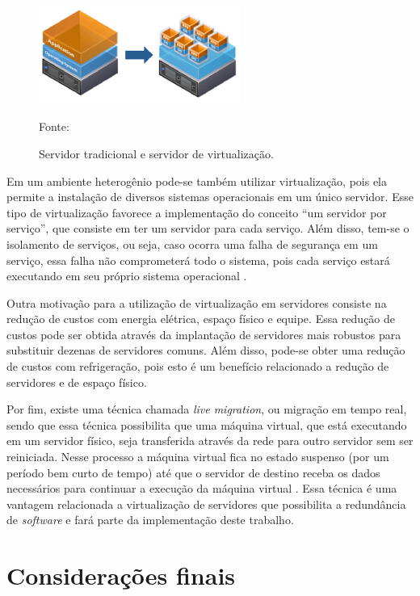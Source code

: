\begin{figure}[h!]
 \centering
 \includegraphics[width=250px]{img/virtualizacao_servidores.eps}
 \caption{Servidor tradicional e servidor de virtualização.}
 \label{fig:virtualizacao_servidores}
 Fonte: \citet{interspire2016}
\end{figure}

Em um ambiente heterogênio pode-se também utilizar virtualização, pois ela permite a instalação de diversos sistemas operacionais em um 
único servidor. Esse tipo de virtualização favorece a implementação do conceito ``um servidor por serviço'', que consiste em ter um servidor 
para cada serviço. Além disso, tem-se o isolamento de serviços, ou seja, caso ocorra uma falha de segurança em um serviço, essa falha não 
comprometerá todo o sistema, pois cada serviço estará executando em seu próprio sistema operacional \cite{carissimi2008}.

Outra motivação para a utilização de virtualização em servidores consiste na redução de custos com energia elétrica, espaço físico e equipe. 
Essa redução de custos pode ser obtida através da implantação de servidores mais robustos para substituir dezenas de servidores comuns. 
Além disso, pode-se obter uma redução de custos com refrigeração, pois esto é um benefício relacionado a redução de servidores e de espaço físico.

Por fim, existe uma técnica chamada \textit{live migration}, ou migração em tempo real, sendo que essa técnica possibilita que uma máquina virtual, 
que está executando em um servidor físico, seja transferida através da rede para outro servidor sem ser reiniciada. Nesse processo a máquina 
virtual fica no estado suspenso (por um período bem curto de tempo) até que o servidor de destino receba os dados necessários para continuar 
a execução da máquina virtual \cite{silva2009}. Essa técnica é uma vantagem relacionada a virtualização de servidores que possibilita a redundância
de \textit{software} e fará parte da implementação deste trabalho.

\section{Considerações finais}

